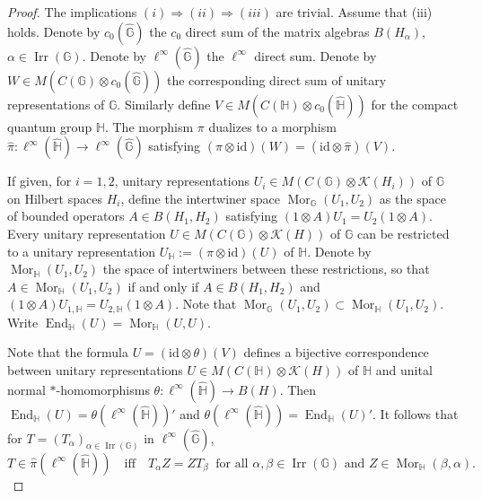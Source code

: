 \documentclass[12pt]{amsart}
\theoremstyle{remark}
\theoremstyle{remark}
\begin{document}
\begin{proof}
The implications $(i) \Rightarrow (ii) \Rightarrow (iii)$ are trivial. Assume that (iii) holds. Denote by $c_0(\widehat{\mathbb{G}})$ the $c_0$ direct sum of the matrix algebras $B(H_\alpha)$, $\alpha \in \operatorname{Irr}(\mathbb{G})$. Denote by $\ell^\infty(\widehat{\mathbb{G}})$ the $\ell^\infty$ direct sum. Denote by $W \in M(C(\mathbb{G}) \otimes c_0(\widehat{\mathbb{G}}))$ the corresponding direct sum of unitary representations of $\mathbb{G}$. Similarly define $V \in M(C(\mathbb{H}) \otimes c_0(\widehat{\mathbb{H}}))$ for the compact quantum group $\mathbb{H}$. The morphism $\pi$ dualizes to a morphism $\widehat{\pi} : \ell^\infty(\widehat{\mathbb{H}}) \to \ell^\infty(\widehat{\mathbb{G}})$ satisfying $(\pi \otimes \mathrm{id})(W) = (\mathrm{id} \otimes \widehat{\pi})(V)$.

\bigskip

If given, for $i = 1,2$, unitary representations $U_i \in M(C(\mathbb{G}) \otimes \mathcal{K}(H_i))$ of $\mathbb{G}$ on Hilbert spaces $H_i$, define the intertwiner space $\operatorname{Mor}_\mathbb{G}(U_1,U_2)$ as the space of bounded operators $A \in B(H_1,H_2)$ satisfying $(1 \otimes A) U_1 = U_2 (1 \otimes A)$. Every unitary representation $U \in M(C(\mathbb{G}) \otimes \mathcal{K}(H))$ of $\mathbb{G}$ can be restricted to a unitary representation $U_\mathbb{H} := (\pi \otimes \mathrm{id})(U)$ of $\mathbb{H}$. Denote by $\operatorname{Mor}_\mathbb{H}(U_1,U_2)$ the space of intertwiners between these restrictions, so that $A \in \operatorname{Mor}_\mathbb{H}(U_1,U_2)$ if and only if $A \in B(H_1,H_2)$ and $(1 \otimes A) U_{1,\mathbb{H}} = U_{2,\mathbb{H}} (1 \otimes A)$. Note that $\operatorname{Mor}_\mathbb{G}(U_1,U_2) \subset \operatorname{Mor}_\mathbb{H}(U_1,U_2)$. Write $\operatorname{End}_\mathbb{H}(U) = \operatorname{Mor}_\mathbb{H}(U,U)$.

\bigskip

Note that the formula $U = (\mathrm{id} \otimes \theta)(V)$ defines a bijective correspondence between unitary representations $U \in M(C(\mathbb{H}) \otimes \mathcal{K}(H))$ of $\mathbb{H}$ and unital normal $*$-homomorphisms $\theta : \ell^\infty(\widehat{\mathbb{H}}) \to B(H)$. Then $\operatorname{End}_\mathbb{H}(U) = \theta(\ell^\infty(\widehat{\mathbb{H}}))'$ and $\theta(\ell^\infty(\widehat{\mathbb{H}})) = \operatorname{End}_\mathbb{H}(U)'$. It follows that for $T = (T_\alpha)_{\alpha \in \operatorname{Irr}(\mathbb{G})}$ in $\ell^\infty(\widehat{\mathbb{G}})$,
\begin{equation}\label{eq.rel-com}
T \in \widehat{\pi}(\ell^\infty(\widehat{\mathbb{H}})) \quad\text{iff}\quad T_\alpha Z = Z T_\beta \;\;\text{for all $\alpha,\beta \in \operatorname{Irr}(\mathbb{G})$ and $Z \in \operatorname{Mor}_\mathbb{H}(\beta,\alpha)$.}
\end{equation}



\end{proof}
\end{document}
